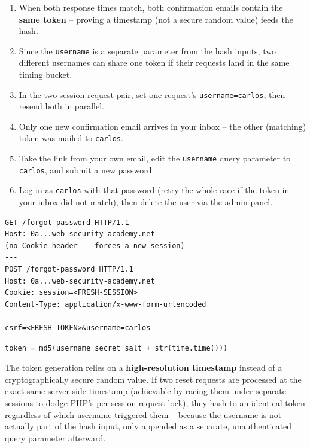 \documentclass[11pt]{article}
\begin{document}
\begin{enumerate}[leftmargin=1.2em]
  \item When both response times match, both confirmation emails contain the \textbf{same token} -- proving a timestamp (not a secure random value) feeds the hash.
  \item Since the \texttt{username} is a separate parameter from the hash inputs, two different usernames can share one token if their requests land in the same timing bucket.
  \item In the two-session request pair, set one request's \texttt{username=carlos}, then resend both in parallel.
  \item Only one new confirmation email arrives in your inbox -- the other (matching) token was mailed to \texttt{carlos}.
  \item Take the link from your own email, edit the \texttt{username} query parameter to \texttt{carlos}, and submit a new password.
  \item Log in as \texttt{carlos} with that password (retry the whole race if the token in your inbox did not match), then delete the user via the admin panel.
\end{enumerate}
\begin{lstlisting}[style=http]
GET /forgot-password HTTP/1.1
Host: 0a...web-security-academy.net
(no Cookie header -- forces a new session)
---
POST /forgot-password HTTP/1.1
Host: 0a...web-security-academy.net
Cookie: session=<FRESH-SESSION>
Content-Type: application/x-www-form-urlencoded

csrf=<FRESH-TOKEN>&username=carlos
\end{lstlisting}
\begin{causebox}
\begin{lstlisting}[style=code]
token = md5(username_secret_salt + str(time.time()))
\end{lstlisting}
The token generation relies on a \textbf{high-resolution timestamp} instead of a cryptographically secure random value. If two reset requests are processed at the exact same server-side timestamp (achievable by racing them under separate sessions to dodge PHP's per-session request lock), they hash to an identical token regardless of which username triggered them -- because the username is not actually part of the hash input, only appended as a separate, unauthenticated query parameter afterward.
\end{causebox}

\end{document}
